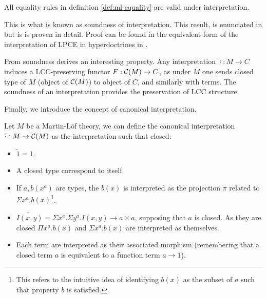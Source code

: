 \begin{definition}
\begin{proposition}[Soundness]
All equality rules in definition \ref{def:ml-equality} are valid under interpretation.
\end{proposition}


This is what is known as soundness of interpretation. This result, is enunciated in \cite[proposition 4.5]{seely1984locally} but is is proven in detail. Proof can be found in the equivalent form of the interpretation of LPCE in hyperdoctrines in \cite{seely1983hyperdoctrines}.

\begin{remark}\label{rem:induced-functor} From soundness derives an interesting property. Any interpretation $\overline{\cdot}: M \to C$ induces a LCC-preserving functor $F:\mathcal{C} (M) \to C$, as under $\overline M$ one sends closed type of $M$ (object of $\mathcal{C} (M)$) to object of $C$, and similarly with terms. The soundness of an interpretation provides the preservation of LCC structure. 
\end{remark}


Finally, we introduce the concept of canonical interpretation.

\begin{definition}
  Let $M$ be a Martin-L\"of theory, we can define the canonical interpretation $\tilde \cdot: M\to \mathcal{C}(M)$ as the interpretation such that closed:
  \begin{itemize}
  \item $\tilde 1 = 1$.
  \item A closed type correspond to itself.
  \item If $a, b(x^a)$ are types, the $b(x)$ is interpreted as the projection  $\pi$ related to  $\Sigma x^a.b(x)$\footnote{This refers to the intuitive idea of identifying $b(x)$ as the subset of $a$ such that property $b$ is satisfied.}.
  \item $\widetilde{I(x,y)} = \Sigma x^a.\Sigma y^a. I(x,y) \to a\times a$, supposing that $a$ is closed. As they are closed $\Pi x^a.b(x)$ and $\Sigma x^a.b(x)$ are interpreted as themselves.
  \item Each term are interpreted as their associated morphism (remembering that a closed term $a$ is equivalent to a function term $a\to 1$).
  \end{itemize}
\end{definition}


\end{definition}
